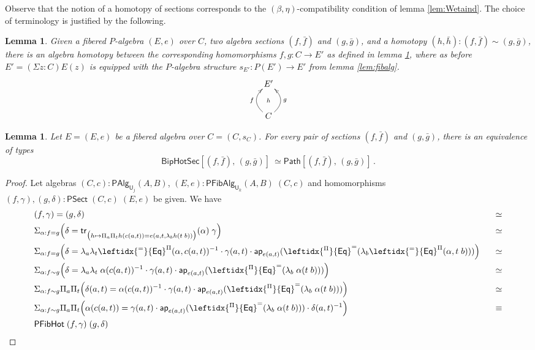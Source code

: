 \documentclass[10pt,a4paper,oneside,reqno]{amsart}
\numberwithin{equation}{section}
\theoremstyle{mythm}
\newtheorem{lemma}[theorem]{Lemma}
\theoremstyle{mydef}
\theoremstyle{myrmk}
\newcommand{\trans}{\mathsf{tr}}
\newcommand{\ct}{\cdot}
\newcommand{\funext}{\leftidx{^\Pi}{\mathsf{Eq}}^{=}}
\newcommand{\happly}{\leftidx{^=}{\mathsf{Eq}}^{\Pi}}
\newcommand{\prd}[1]{\Pi_{#1}}
\newcommand{\sm}[1]{\Sigma_{#1}}
\newcommand{\lam}[1]{\lambda_{#1}}
\newcommand{\app}{\mathsf{ap}}
\newcommand{\Id}{\mathsf{Path}}
\newcommand{\UU}{\mathsf{U}}
\newcommand{\HoSec}{\mathsf{BipHotSec}}
\newcommand{\WFibCell}{\mathsf{PFibHot}}
\newcommand{\WAlg}{\mathsf{PAlg}}
\newcommand{\WFibAlg}{\mathsf{PFibAlg}}
\newcommand{\WFibHom}{\mathsf{PSect}}
\begin{document}
Observe that the notion of a homotopy of sections corresponds to the $(\beta, \eta)$-compatibility condition of lemma \ref{lem:Wetaind}.  The choice of terminology is justified by the following.

\begin{lemma}\label{lem:fibalghom}
Given a fibered $P$-algebra $(E, e)$ over $C$, two algebra sections $(f, \bar{f})$ and $(g, \bar{g})$, and a homotopy $(h, \bar{h}) : (f, \bar{f}) \sim (g, \bar{g})$, there is an algebra  homotopy between the corresponding homomorphisms $f, g : C\to E'$ as defined in lemma \ref{lem:fibalghom}, where as before $E' = (\Sigma z : C) E(z)$ is equipped with the $P$-algebra structure $s_{E'} :P(E')\to E'$ from lemma \ref{lem:fibalg}.
\[
\xymatrix{
 E' \ar@{}[d]|{h} \\ 
C \ar@/^1.2pc/[u]^{f}  \ar@/_1.2pc/[u]_{g}
}
 \]
\end{lemma}




\begin{lemma}\label{lem:fibhomeqid} Let $E = (E, e)$ be a fibered algebra over $C = (C, s_C)$. 
For every pair of sections $(f, \bar{f})$ and $(g, \bar{g})$, 
there is an equivalence of types
\[
\HoSec[ (f, \bar{f}) ,\, (g, \bar{g}) ]\
\simeq 
\Id[ (f, \bar{f}) ,\, (g, \bar{g}) ] \, .
\]
\end{lemma}

\begin{proof}
Let algebras $(C,c) : \WAlg_{\UU_j}(A,B)$, $(E,e) : \WFibAlg_{\UU_k}(A,B) \; (C,c)$ and homomorphisms $(f,\gamma), (g,\delta) : \WFibHom \; (C,c) \; (E,e)$ be given. We have
\begin{alignat*}{4}
& (f,\gamma) = (g,\delta) & \simeq \\
& \sm{\alpha : f = g} \Big(\delta = \trans_{\big(h \mapsto \prd{a}\prd{t} h(c(a,t)) = e(a,t,\lam{b} h(t\;b))\big)}(\alpha) \; \gamma\Big) & \simeq \\
& \sm{\alpha : f = g} \Big(\delta = \lam{a} \lam{t} \happly(\alpha,c(a,t))^{-1} \ct \gamma(a,t) \ct \app_{e(a,t)}(\funext (\lam{b}\happly(\alpha,t \; b))) \Big) & \;\;\; \simeq \\
& \sm{\alpha : f \sim g} \Big(\delta = \lam{a} \lam{t} \; \alpha(c(a,t))^{-1} \ct \gamma(a,t) \ct \app_{e(a,t)}(\funext (\lam{b}\; \alpha(t \; b))) \Big) & \simeq \\
& \sm{\alpha : f \sim g} \prd{a}\prd{t}\Big(\delta(a,t) = \alpha(c(a,t))^{-1} \ct \gamma(a,t) \ct \app_{e(a,t)}(\funext (\lam{b}\; \alpha(t \; b))) \Big) & \simeq \\ 
& \sm{\alpha : f \sim g} \prd{a}\prd{t}\Big(\alpha(c(a,t)) = \gamma(a,t) \ct \app_{e(a,t)}(\funext (\lam{b}\; \alpha(t \; b))) \ct \delta(a,t)^{-1} \Big) & \equiv \\ 
& \WFibCell \; (f,\gamma) \; (g,\delta)
\end{alignat*}
\end{proof}
\end{document}
